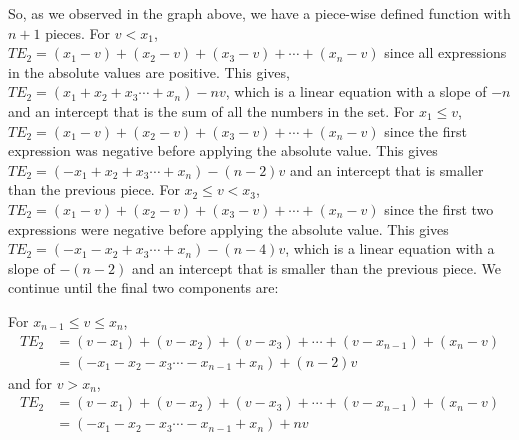 \documentclass[10pt,]{book}
\theoremstyle{ptxdefinitionnotitle}
\theoremstyle{ptxdefinitiontitle}
\numberwithin{equation}{section}
\newcommand{\lt}{<}
\newcommand{\gt}{>}
\newcommand{\amp}{&}
\begin{document}
\begin{example}[{.}]
So, as we observed in the graph above, we have a piece-wise defined function with \(n + 1\) pieces. For \(v \lt x_1\), \(T{E_2} = \left( {{x_1} - v} \right) + \left( {{x_2} - v} \right) + \left( {{x_3} - v} \right) +  \cdots  + \left( {{x_n} - v} \right)\) since all expressions in the absolute values are positive. This gives, \(T{E_2} = \left( {{x_1} + {x_2} + {x_3} \cdots  + {x_n}} \right) - nv\), which is a linear equation with a slope of \(- n\) and an intercept that is the sum of all the numbers in the set. For \(x_1 \le v\), \(T{E_2} = \left( {{x_1} - v} \right) + \left( {{x_2} - v} \right) + \left( {{x_3} - v} \right) +  \cdots  + \left( {{x_n} - v} \right)\) since the first expression was negative before applying the absolute value. This gives \\ \(T{E_2} = \left( { - {x_1} + {x_2} + {x_3} \cdots  + {x_n}} \right) - \left( {n - 2} \right)v\) and an intercept that is smaller than the previous piece. For \(x_2 \le v \lt x_3\), \(T{E_2} = \left( {{x_1} - v} \right) + \left( {{x_2} - v} \right) + \left( {{x_3} - v} \right) +  \cdots  + \left( {{x_n} - v} \right)\) since the first two expressions were negative before applying the absolute value. This gives \\ \(T{E_2} = \left( { - {x_1} - {x_2} + {x_3} \cdots  + {x_n}} \right) - \left( {n - 4} \right)v\), which is a linear equation with a slope of \(- \left ( n - 2 \right)\) and an intercept that is smaller than the previous piece. We continue until the final two components are: \\%
\par
\hypertarget{p-66}{}%
\noindent For \(x_{n-1} \leq v \le x_{n}\),%
\begin{align*}
T{E_2} \amp = \left( {v - {x_1}} \right) + \left( {v - {x_2}} \right) + \left( {v - {x_3}} \right) +  \cdots  + \left( {v - {x_{n - 1}}} \right) + \left( {{x_n} - v} \right)\\
\amp = \left( { - {x_1} - {x_2} - {x_3} \cdots  - {x_{n - 1}} + {x_n}} \right) + \left( {n - 2} \right)v
\end{align*}
\noindent and for \(v \gt x_n\),%
\begin{align*}
T{E_2} \amp = \left( {v - {x_1}} \right) + \left( {v - {x_2}} \right) + \left( {v - {x_3}} \right) +  \cdots  + \left( {v - {x_{n - 1}}} \right) + \left( {{x_n} - v} \right)\\
\amp = \left( { - {x_1} - {x_2} - {x_3} \cdots  - {x_{n - 1}} + {x_n}} \right) + nv
\end{align*}

\end{example}
\end{document}
